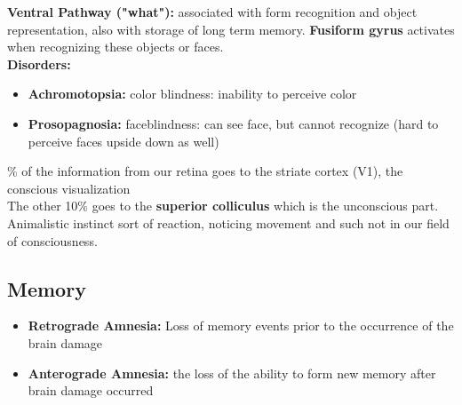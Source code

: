 \documentclass{article}
\begin{document}
\noindent\textbf{Ventral Pathway ("what"):} associated with form recognition and object representation, also with storage of long term memory. \textbf{Fusiform gyrus} activates when recognizing these objects or faces.\\
\textbf{Disorders:}
\begin{itemize}
    \item \textbf{Achromotopsia:} color blindness: inability to perceive color
    \item \textbf{Prosopagnosia:} faceblindness: can see face, but cannot recognize (hard to perceive faces upside down as well) 
\end{itemize}

\% of the information from our retina goes to the striate cortex (V1), the conscious visualization \\
The other 10\% goes to the \textbf{superior colliculus} which is the unconscious part. Animalistic instinct sort of reaction, noticing movement and such not in our field of consciousness. 

\subsection{Memory}
\begin{itemize}
    \item \textbf{Retrograde Amnesia:} Loss of memory events prior to the occurrence of the brain damage
    \item \textbf{Anterograde Amnesia:} the loss of the ability to form new memory after brain damage occurred
\end{itemize}
\end{document}
